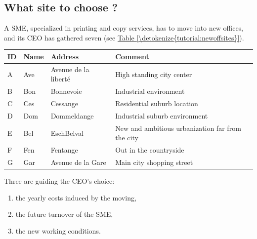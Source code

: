 \documentclass[a4paper,12pt,english]{sphinxhowto}
\begin{document}
\subsection{What site to choose ?}
\label{\detokenize{tutorial:what-site-to-choose}}
A SME, specialized in printing and copy services, has to move into new offices, and its CEO has gathered seven  (see \hyperref[\detokenize{tutorial:newoffsites}]{Table \ref{\detokenize{tutorial:newoffsites}}}).


\begin{savenotes}\sphinxattablestart
\centering
{}
\sphinxthecaptionisattop
{}\label{\detokenize{tutorial:newoffsites}}
\sphinxaftertopcaption
\begin{tabulary}{\linewidth}[t]{|T|T|T|T|}
\hline
\sphinxstyletheadfamily 
ID
&\sphinxstyletheadfamily 
Name
&\sphinxstyletheadfamily 
Address
&\sphinxstyletheadfamily 
Comment
\\
\hline
A
&
Ave
&
Avenue de la liberté
&
High standing city center
\\
\hline
B
&
Bon
&
Bonnevoie
&
Industrial environment
\\
\hline
C
&
Ces
&
Cessange
&
Residential suburb location
\\
\hline
D
&
Dom
&
Dommeldange
&
Industrial suburb environment
\\
\hline
E
&
Bel
&
Esch\sphinxhyphen{}Belval
&
New and ambitious urbanization far from the city
\\
\hline
F
&
Fen
&
Fentange
&
Out in the countryside
\\
\hline
G
&
Gar
&
Avenue de la Gare
&
Main city shopping street
\\
\hline
\end{tabulary}
\par
\sphinxattableend\end{savenotes}

Three  are guiding the CEO’s choice:
\begin{enumerate}
%
\item {} 
 the yearly costs induced by the moving,

\item {} 
 the future turnover of the SME,

\item {} 
 the new working conditions.

\end{enumerate}
\end{document}
